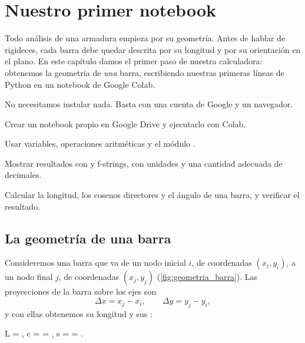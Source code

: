 \chapter{Nuestro primer notebook}\label{cap:primer_notebook}

Todo análisis de una armadura empieza por su geometría. Antes de hablar de
rigideces, cada barra debe quedar descrita por su longitud y por su
orientación en el plano. En este capítulo damos el primer paso de nuestra
calculadora: obtenemos la geometría de \emph{una} barra, escribiendo nuestras
primeras líneas de Python en un notebook de Google Colab.

No necesitamos instalar nada. Basta con una cuenta de Google y un navegador.

\begin{objetivos}
  \item Crear un notebook propio en Google Drive y ejecutarlo con Colab.
  \item Usar variables, operaciones aritméticas y el módulo .
  \item Mostrar resultados con  y f-strings, con unidades y una
    cantidad adecuada de decimales.
  \item Calcular la longitud, los cosenos directores y el ángulo de una barra,
    y verificar el resultado.
\end{objetivos}

\section{La geometría de una barra}\label{sec:geometria_barra}

Consideremos una barra que va de un nodo inicial $i$, de coordenadas
$(x_i, y_i)$, a un nodo final $j$, de coordenadas $(x_j, y_j)$
(\cref{fig:geometria_barra}). Las proyecciones de la barra sobre los ejes son
\begin{equation}\label{eq:proyecciones}
  \Delta x = x_j - x_i, \qquad \Delta y = y_j - y_i,
\end{equation}
y con ellas obtenemos su longitud y sus :

\begin{ecuacionclave}
  L = , \qquad
  c = \cos\theta = , \qquad
  s = \sin\theta = .
\end{ecuacionclave}

